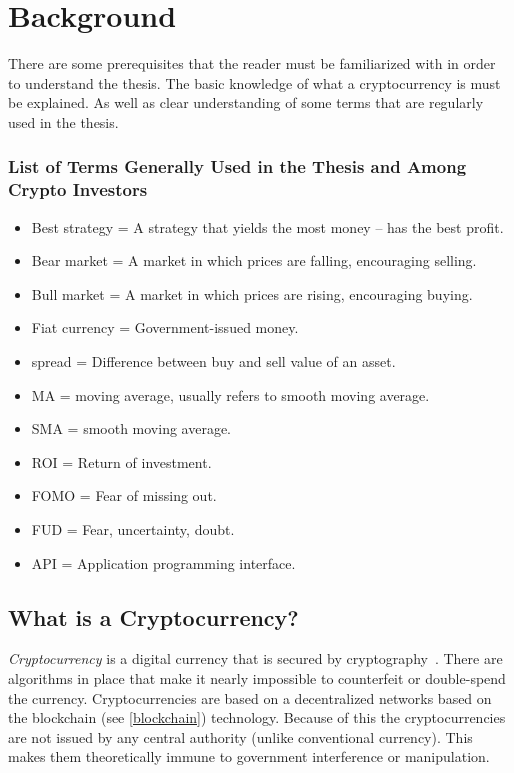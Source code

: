 \chapter{Background}
\label{chapter-background}

There are some prerequisites that the reader must be familiarized with in order to understand the thesis. The basic knowledge of what a cryptocurrency is must be explained. As well as clear understanding of some terms that are regularly used in the thesis.

\subsection*{List of Terms Generally Used in the Thesis and Among Crypto Investors}
\begin{itemize}
    \item Best strategy = A strategy that yields the most money -- has the best profit.
    \item Bear market = A market in which prices are falling, encouraging selling.
    \item Bull market = A market in which prices are rising, encouraging buying.
    \item Fiat currency = Government-issued money.
    \item spread = Difference between buy and sell value of an asset.
    \item MA = moving average, usually refers to smooth moving average.
    \item SMA = smooth moving average.
    \item ROI = Return of investment.
    \item FOMO = Fear of missing out.
    \item FUD = Fear, uncertainty, doubt.
    \item API = Application programming interface.
\end{itemize}

\section{What is a Cryptocurrency?}
\emph{Cryptocurrency} is a digital currency that is secured by cryptography~\cite{investopedia-cryptocurrency}. There are algorithms in place that make it nearly impossible to counterfeit or double-spend the currency. Cryptocurrencies are based on a decentralized networks based on the blockchain (see \ref{blockchain}) technology. Because of this the cryptocurrencies are not issued by any central authority (unlike conventional currency). This makes them theoretically immune to government interference or manipulation.

